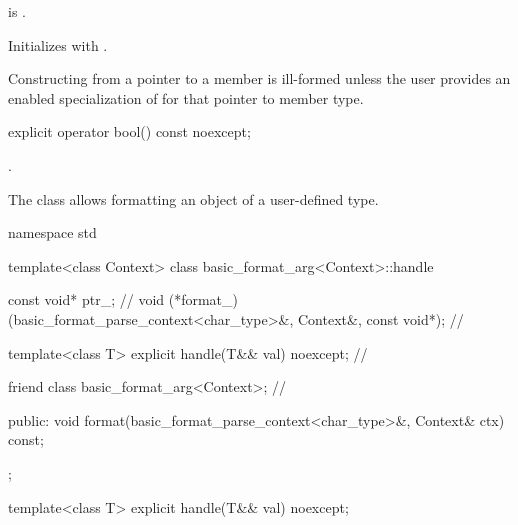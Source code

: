 \begin{itemdescr}
\pnum
\constraints
{} is .

\pnum
\effects
Initializes  with .

\pnum
\begin{note}
Constructing  from
a pointer to a member is ill-formed unless
the user provides an enabled specialization of
 for that pointer to member type.
\end{note}
\end{itemdescr}
%

%
\begin{itemdecl}
explicit operator bool() const noexcept;
\end{itemdecl}

\begin{itemdescr}
\pnum
\returns
{}.
\end{itemdescr}

\pnum
The class  allows formatting an object of a user-defined type.

%
%
\begin{codeblock}
namespace std {
  template<class Context>
  class basic_format_arg<Context>::handle {
    const void* ptr_;                                           // \expos
    void (*format_)(basic_format_parse_context<char_type>&,
                    Context&, const void*);                     // \expos

    template<class T> explicit handle(T&& val) noexcept;        // \expos

    friend class basic_format_arg<Context>;                     // \expos

  public:
    void format(basic_format_parse_context<char_type>&, Context& ctx) const;
  };
}
\end{codeblock}

%
\begin{itemdecl}
template<class T> explicit handle(T&& val) noexcept;
\end{itemdecl}

